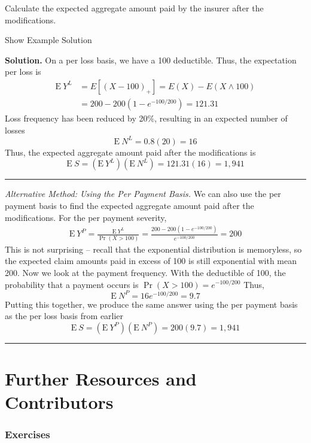 \documentclass[]{book}
\theoremstyle{definition}
\theoremstyle{definition}
\theoremstyle{definition}
\theoremstyle{remark}
\begin{document}
Calculate the expected aggregate amount paid by the insurer after the
modifications.

Show Example Solution

\hypertarget{toggleExampleAggLoss.5.7}{}
\textbf{Solution.} On a per loss basis, we have a 100 deductible. Thus,
the expectation per loss is \[\begin{aligned}
\mathrm{E~} Y^L &= E[(X-100)_+] = E(X) - E(X\wedge 100) \\
&= 200 - 200(1-e^{-100/200}) = 121.31
\end{aligned}\] Loss frequency has been reduced by 20\(\%\), resulting
in an expected number of losses \[\mathrm{E~}N^L = 0.8(20) = 16\] Thus,
the expected aggregate amount paid after the modifications is
\[\mathrm{E~}S = \left(\mathrm{E~}Y^L \right) \left( \mathrm{E~} N^L\right) = 121.31(16) = 1,941\]

\begin{center}\rule{0.5\linewidth}{\linethickness}\end{center}

\emph{Alternative Method: Using the Per Payment Basis.} We can also use
the per payment basis to find the expected aggregate amount paid after
the modifications. For the per payment severity, \[\begin{aligned}
\mathrm{E~} Y^P = \frac{\mathrm{E~} Y^L}{\Pr(X > 100)} = \frac{200 - 200(1-e^{-100/200})}{e^{-100/200}} = 200
\end{aligned}\] This is not surprising -- recall that the exponential
distribution is memoryless, so the expected claim amounts paid in excess
of 100 is still exponential with mean 200. Now we look at the payment
frequency. With the deductible of 100, the probability that a payment
occurs is \(\Pr(X > 100) = e^{-100/200}\) Thus,
\[\mathrm{E~} N^P = 16 e^{-100/200} = 9.7\] Putting this together, we
produce the same answer using the per payment basis as the per loss
basis from earlier
\[\mathrm{E~}S = \left( \mathrm{E~} Y^P \right) \left( \mathrm{E~} N^P \right) = 200(9.7) = 1,941\]

\begin{center}\rule{0.5\linewidth}{\linethickness}\end{center}

\section{Further Resources and
Contributors}\label{AL-further-reading-and-resources}

\subsubsection*{Exercises}\label{exercises-3}
\end{document}
